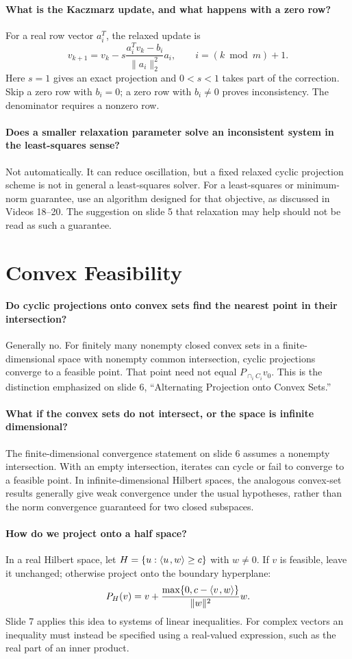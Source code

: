 \documentclass[10pt,english]{article}
\begin{document}
\paragraph{What is the Kaczmarz update, and what happens with a zero row?}
For a real row vector $a_i^T$, the relaxed update is
\[
v_{k+1}=v_k-s\frac{a_i^T v_k-b_i}{\|a_i\|_2^2}a_i,
\qquad i=(k\bmod m)+1.
\]
Here $s=1$ gives an exact projection and $0<s<1$ takes part of the correction.
Skip a zero row with $b_i=0$; a zero row with $b_i\neq0$ proves inconsistency.
The denominator requires a nonzero row.

\paragraph{Does a smaller relaxation parameter solve an inconsistent system in the least-squares sense?}
Not automatically. It can reduce oscillation, but a fixed relaxed cyclic projection scheme is not in general a least-squares solver.
For a least-squares or minimum-norm guarantee, use an algorithm designed for that objective, as discussed in Videos 18--20.
The suggestion on slide 5 that relaxation may help should not be read as such a guarantee.

\section{Convex Feasibility}

\paragraph{Do cyclic projections onto convex sets find the nearest point in their intersection?}
Generally no. For finitely many nonempty closed convex sets in a finite-dimensional space with nonempty common intersection, cyclic projections converge to a feasible point.
That point need not equal $P_{\cap_i C_i}v_0$.
This is the distinction emphasized on slide 6, ``Alternating Projection onto Convex Sets.''

\paragraph{What if the convex sets do not intersect, or the space is infinite dimensional?}
The finite-dimensional convergence statement on slide 6 assumes a nonempty intersection.
With an empty intersection, iterates can cycle or fail to converge to a feasible point.
In infinite-dimensional Hilbert spaces, the analogous convex-set results generally give weak convergence under the usual hypotheses, rather than the norm convergence guaranteed for two closed subspaces.

\paragraph{How do we project onto a half space?}
In a real Hilbert space, let $H=\{u:{\left\langle u \mskip2mu , w \right\rangle}\geq c\}$ with $w\neq0$.
If $v$ is feasible, leave it unchanged; otherwise project onto the boundary hyperplane:
\[
P_H(v)=v+\frac{\max\{0,c-{\left\langle v \mskip2mu , w \right\rangle}\}}{\|w\|^2}w.
\]
Slide 7 applies this idea to systems of linear inequalities.
For complex vectors an inequality must instead be specified using a real-valued expression, such as the real part of an inner product.
\end{document}
